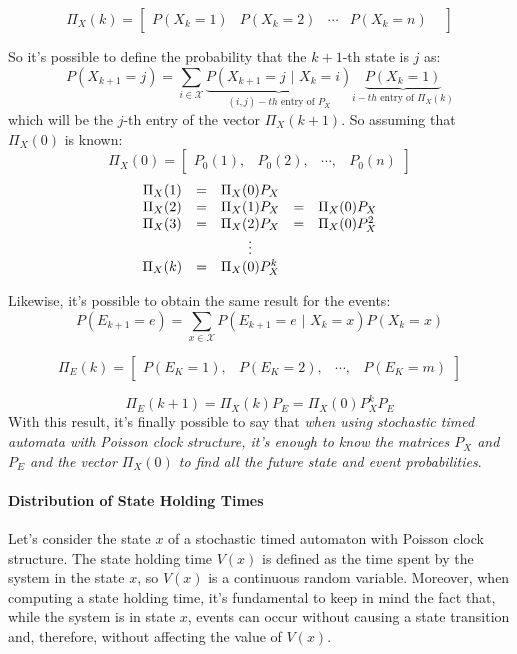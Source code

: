 \documentclass[12pt,a4paper]{article}
\begin{document}
\bigskip
$$
\Pi_X(k)=
\left[
\begin{matrix}
P(X_k=1)&
P(X_k=2)&
\cdots&
P(X_k=n)&
\end{matrix}
\right]
$$

\bigskip
\noindent
So it's possible to define the probability that the $k+1$-th state is $j$ as:
$$
P\left(X_{k+1}=j\right)=\sum_{i\in \mathcal{X}}{
\underbrace{P\left(X_{k+1}=j \hspace{4pt}|\hspace{4pt} X_k=i\right)}_{(i,j)-th\text{ entry of }P_X}
\underbrace{P\left(X_k=1\right)}_{i-th\text{ entry of }\Pi_X(k)}
}
$$ 
which will be the $j$-th entry of the vector $\Pi_X(k+1)$. 
\newpage
\noindent
So assuming that $\Pi_X(0)$ is known:
$$
\Pi_X(0)=
\left[
\begin{matrix}
P_0(1),&
P_0(2),&
\cdots,&
P_0(n)
\end{matrix}
\right]
$$
$$
\begin{matrix}
\Pi_X(1)&=&\Pi_X(0)P_X\cr
\Pi_X(2)&=&\Pi_X(1)P_X&=&\Pi_X(0)P_X\cr
\Pi_X(3)&=&\Pi_X(2)P_X&=&\Pi_X(0)P_X^2\cr
&&\vdots\cr
\Pi_X(k)&=&\Pi_X(0)P_X^k
\end{matrix}
$$

\bigskip
\noindent
Likewise, it's possible to obtain the same result for the events: 
$$
P\left(E_{k+1}=e\right)=\sum_{x\in\mathcal{X}}{P\left(E_{k+1}=e\hspace{4pt}|\hspace{4pt}X_k=x\right)P\left(X_k=x\right)}
$$

$$
\Pi_E(k)=
\left[
\begin{matrix}
P\left(E_K=1\right),&
P\left(E_K=2\right),&
\cdots,&
P\left(E_K=m\right)
\end{matrix}
\right]
$$

$$
\Pi_E(k+1)=\Pi_X(k)P_E=\Pi_X(0)P_X^kP_E
$$
With this result, it's finally possible to say that \emph{when using stochastic timed automata with Poisson clock structure, it's enough to know the matrices $P_X$ and $P_E$ and the vector $\Pi_X(0)$ to find all the future state and event probabilities}. 
\paragraph{Distribution of State Holding Times} Let's consider the state $x$ of a stochastic timed automaton with Poisson clock structure. The state holding time $V(x)$ is defined as the time spent by the system in the state $x$, so $V(x)$ is a continuous random variable. Moreover, when computing a state holding time, it's fundamental to keep in mind the fact that, while the system is in state $x$, events can occur without causing a state transition and, therefore, without affecting the value of $V(x)$.
\end{document}
